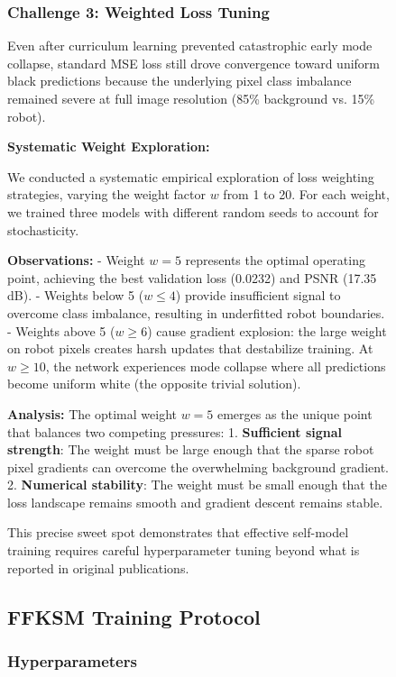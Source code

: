 \documentclass[12pt,a4paper,oneside]{report}
\begin{document}
\begin{figure}[H]
\subsubsection{Challenge 3: Weighted Loss Tuning}

Even after curriculum learning prevented catastrophic early mode collapse, standard MSE loss still drove convergence toward uniform black predictions because the underlying pixel class imbalance remained severe at full image resolution (85\% background vs. 15\% robot).

\textbf{Systematic Weight Exploration:}

We conducted a systematic empirical exploration of loss weighting strategies, varying the weight factor $w$ from 1 to 20. For each weight, we trained three models with different random seeds to account for stochasticity.

\textbf{Observations:}
- Weight $w = 5$ represents the optimal operating point, achieving the best validation loss (0.0232) and PSNR (17.35 dB).
- Weights below 5 ($w \leq 4$) provide insufficient signal to overcome class imbalance, resulting in underfitted robot boundaries.
- Weights above 5 ($w \geq 6$) cause gradient explosion: the large weight on robot pixels creates harsh updates that destabilize training. At $w \geq 10$, the network experiences mode collapse where all predictions become uniform white (the opposite trivial solution).

\textbf{Analysis:} The optimal weight $w = 5$ emerges as the unique point that balances two competing pressures:
1. \textbf{Sufficient signal strength}: The weight must be large enough that the sparse robot pixel gradients can overcome the overwhelming background gradient.
2. \textbf{Numerical stability}: The weight must be small enough that the loss landscape remains smooth and gradient descent remains stable.

This precise sweet spot demonstrates that effective self-model training requires careful hyperparameter tuning beyond what is reported in original publications.

\subsection{FFKSM Training Protocol}

\subsubsection{Hyperparameters}


\end{figure}
\end{document}

